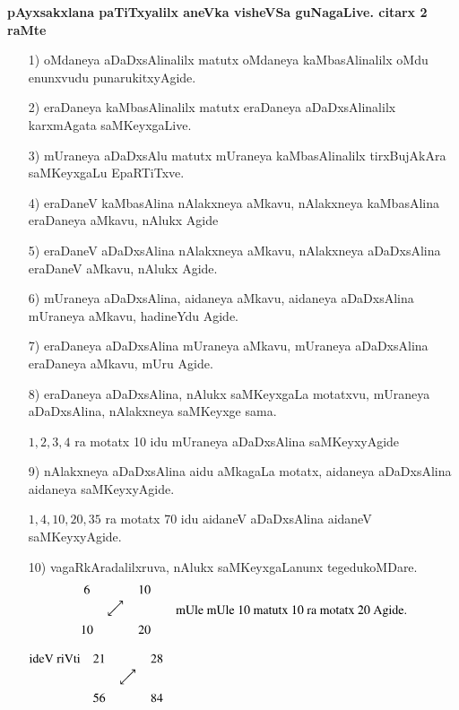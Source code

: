 \noindent
\textbf{pAyxsakxlana paTiTxyalilx aneVka visheVSa guNagaLive. citarx {\rm 2} raMte}
\begin{enumerate}
\item[{\rm 1)}] oMdaneya aDaDxsAlinalilx matutx oMdaneya kaMbasAlinalilx oMdu enunxvudu punarukitxyAgide.

\item[{\rm 2)}] eraDaneya kaMbasAlinalilx matutx eraDaneya aDaDxsAlinalilx karxmAgata saMKeyxgaLive.

\item[{\rm 3)}] mUraneya aDaDxsAlu matutx mUraneya kaMbasAlinalilx tirxBujAkAra saMKeyxgaLu EpaRTiTxve.

\item[{\rm 4)}]eraDaneV kaMbasAlina nAlakxneya aMkavu, nAlakxneya kaMbasAlina eraDaneya aMkavu, nAlukx Agide

\item[{\rm 5)}] eraDaneV aDaDxsAlina nAlakxneya aMkavu, nAlakxneya aDaDxsAlina eraDaneV aMkavu, nAlukx Agide.

\item[{\rm 6)}] mUraneya aDaDxsAlina, aidaneya aMkavu, aidaneya aDaDxsAlina mUraneya aMkavu, hadineYdu Agide.

\item[{\rm 7)}] eraDaneya aDaDxsAlina mUraneya aMkavu, mUraneya aDaDxsAlina eraDaneya aMkavu, mUru Agide.

\item[{\rm 8)}] eraDaneya aDaDxsAlina, nAlukx saMKeyxgaLa motatxvu, mUraneya aDaDxsAlina, nAlakxneya saMKeyxge sama.

$1, 2, 3, 4$ ra motatx {\rm 10} idu mUraneya aDaDxsAlina saMKeyxyAgide

\item[{\rm 9)}] nAlakxneya aDaDxsAlina aidu aMkagaLa motatx, aidaneya aDaDxsAlina aidaneya saMKeyxyAgide.

$1, 4, 10, 20, 35$ ra motatx {\rm 70} idu aidaneV aDaDxsAlina aidaneV saMKeyxyAgide.

\item[{\rm 10)}]  vagaRkAradalilxruva, nAlukx saMKeyxgaLanunx tegedukoMDare. 
$$
\begin{matrix}
6 && 10\\
& \rotatebox{45}{$\longleftrightarrow$} & \\
10 && 20
\end{matrix}
\qquad \text{mUle mUle {\rm 10} matutx {\rm 10} ra motatx {\rm 20} Agide.}
$$
\begin{center}
$\begin{matrix}
\text{ideV riVti} & 21 && 28\\
&& \rotatebox{45}{$\longleftrightarrow$} & \\
& 56 && 84
\end{matrix}$
\quad {}\\[-0.55cm]
\end{center}


\end{enumerate}
